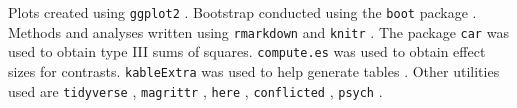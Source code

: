 \documentclass[11pt,]{article}
\begin{document}
Plots created using \texttt{ggplot2} \citep{wickham_ggplot2:_2016}.
Bootstrap conducted using the \texttt{boot} package
\citep{canty_boot:_2017}. Methods and analyses written using
\texttt{rmarkdown} \citep{allaire_rmarkdown:_2019} and \texttt{knitr}
\citep{xie_knitr:_2019}. The package \texttt{car} \citep{fox_r_2011} was
used to obtain type III sums of squares. \texttt{compute.es}
\citep{re_compute.es:_2013} was used to obtain effect sizes for
contrasts. \texttt{kableExtra} was used to help generate tables
\citep{zhu_kableextra:_2019}. Other utilities used are
\texttt{tidyverse} \citep{wickham_tidyverse:_2017}, \texttt{magrittr}
\citep{bache_magrittr:_2014}, \texttt{here} \citep{muller_here:_2017},
\texttt{conflicted} \citep{wickham_conflicted:_2018}, \texttt{psych}
\citep{revelle_psych:_2018}.

\onecolumn



\end{document}
